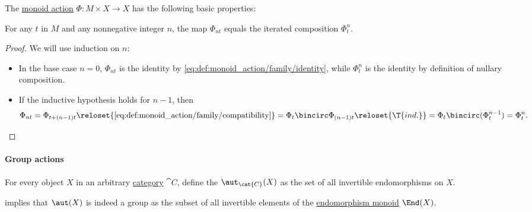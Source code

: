 \begin{proposition}\label{thm:def:monoid_action}
  The \hyperref[def:monoid_action]{monoid action} \( \Phi: M \times X \to X \) has the following basic properties:
  \begin{thmenum}
     For any \( t \) in \( M \) and any nonnegative integer \( n \), the map \( \Phi_{nt} \) equals the iterated composition \( \Phi_t^n \).
  \end{thmenum}
\end{proposition}
\begin{proof}
   We will use induction on \( n \):
  \begin{itemize}
    \item In the base case \( n = 0 \), \( \Phi_{nt} \) is the identity by \eqref{eq:def:monoid_action/family/identity}, while \( \Phi_t^n \) is the identity by definition of nullary composition.

    \item If the inductive hypothesis holds for \( n - 1 \), then
    \begin{equation*}
      \Phi_{nt}
      =
      \Phi_{t + (n - 1)t}
      \reloset {\eqref{eq:def:monoid_action/family/compatibility}} =
      \Phi_t \bincirc \Phi_{(n - 1)t}
      \reloset {\T{ind.}} =
      \Phi_t \bincirc (\Phi_t^{n-1})
      =
      \Phi_t^n.
    \end{equation*}
  \end{itemize}
\end{proof}

\paragraph{Group actions}

\begin{definition}\label{def:automorphism_group}
  For every object \( X \) in an arbitrary \hyperref[def:category]{category} \( \cat{C} \), define the  \( \aut_{\cat{C}}(X) \) as the set of all invertible endomorphisms on \( X \).
\end{definition}
\begin{defproof}
   implies that \( \aut(X) \) is indeed a group as the subset of all invertible elements of the \hyperref[def:endomorphism_monoid]{endomorphism monoid} \( \End(X) \).
\end{defproof}

